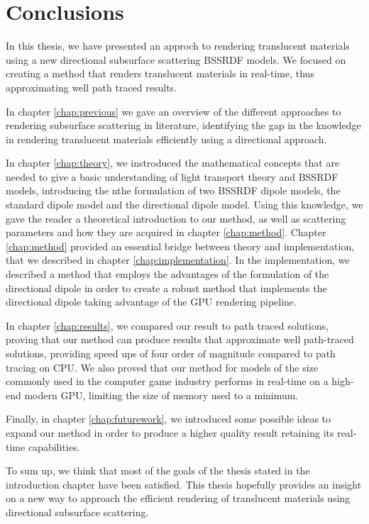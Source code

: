 \chapter{Conclusions}
\label{chap:conclusions}

In this thesis, we have presented an approch to rendering translucent materials using a new directional subsurface scattering BSSRDF models. We focused on creating a method that renders translucent materials in real-time, thus approximating well path traced results.

In chapter \ref{chap:previous} we gave an overview of the different approaches to rendering subsurface scattering in literature, identifying the gap in the knowledge in rendering translucent materials efficiently using a directional approach.

In chapter \ref{chap:theory}, we instroduced the mathematical concepts that are needed to give a basic understanding of light transport theory and BSSRDF models, introducing the nthe formulation of two BSSRDF dipole models, the standard dipole model and the directional dipole model. Using this knowledge, we gave the reader a theoretical introduction to our method, as well as scattering parameters and how they are acquired in chapter \ref{chap:method}. Chapter \ref{chap:method} provided an essential bridge between theory and implementation, that we described in chapter \ref{chap:implementation}. In the implementation, we described a method that employs the advantages of the formulation of the directional dipole in order to create a robust method that implements the directional dipole taking advantage of the GPU rendering pipeline.

In chapter \ref{chap:results}, we compared our result to path traced solutions, proving that our method can produce results that approximate well path-traced solutions, providing speed ups of four order of magnitude compared to path tracing on CPU. We also proved that our method for models of the size commonly used in the computer game industry performs in real-time on a high-end modern GPU, limiting the size of memory used to a minimum. 

Finally, in chapter	\ref{chap:futurework}, we introduced some possible ideas to expand our method in order to produce a higher quality result retaining its real-time capabilities.

To sum up, we think that most of the goals of the thesis stated in the introduction chapter have been satisfied. This thesis hopefully provides an insight on a new way to approach the efficient rendering of translucent materials using directional subsurface scattering. 